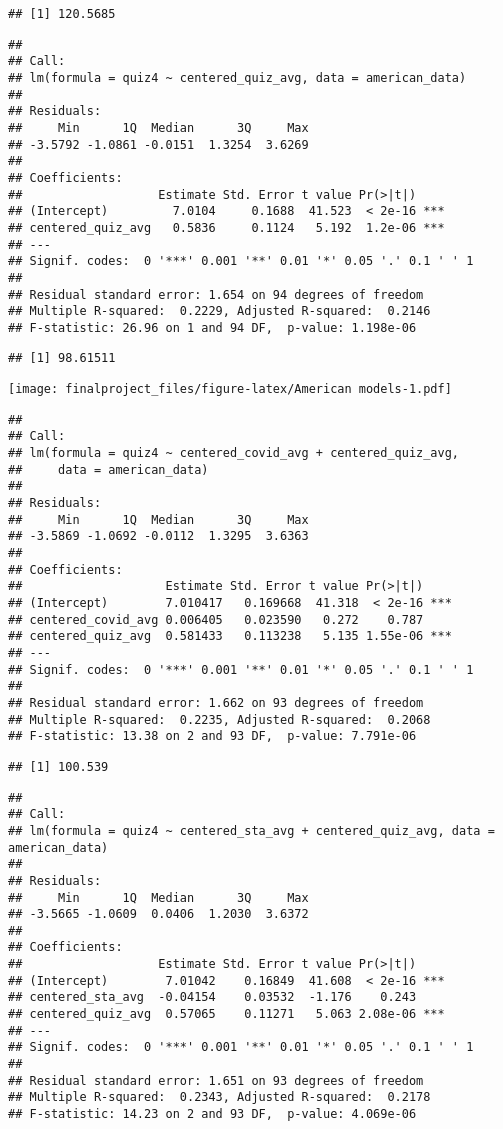 \documentclass[
]{article}
\begin{document}
\begin{verbatim}
## [1] 120.5685
\end{verbatim}

\begin{verbatim}
## 
## Call:
## lm(formula = quiz4 ~ centered_quiz_avg, data = american_data)
## 
## Residuals:
##     Min      1Q  Median      3Q     Max 
## -3.5792 -1.0861 -0.0151  1.3254  3.6269 
## 
## Coefficients:
##                   Estimate Std. Error t value Pr(>|t|)    
## (Intercept)         7.0104     0.1688  41.523  < 2e-16 ***
## centered_quiz_avg   0.5836     0.1124   5.192  1.2e-06 ***
## ---
## Signif. codes:  0 '***' 0.001 '**' 0.01 '*' 0.05 '.' 0.1 ' ' 1
## 
## Residual standard error: 1.654 on 94 degrees of freedom
## Multiple R-squared:  0.2229, Adjusted R-squared:  0.2146 
## F-statistic: 26.96 on 1 and 94 DF,  p-value: 1.198e-06
\end{verbatim}

\begin{verbatim}
## [1] 98.61511
\end{verbatim}

\texttt{[image: finalproject\_files/figure-latex/American models-1.pdf]}

\begin{verbatim}
## 
## Call:
## lm(formula = quiz4 ~ centered_covid_avg + centered_quiz_avg, 
##     data = american_data)
## 
## Residuals:
##     Min      1Q  Median      3Q     Max 
## -3.5869 -1.0692 -0.0112  1.3295  3.6363 
## 
## Coefficients:
##                    Estimate Std. Error t value Pr(>|t|)    
## (Intercept)        7.010417   0.169668  41.318  < 2e-16 ***
## centered_covid_avg 0.006405   0.023590   0.272    0.787    
## centered_quiz_avg  0.581433   0.113238   5.135 1.55e-06 ***
## ---
## Signif. codes:  0 '***' 0.001 '**' 0.01 '*' 0.05 '.' 0.1 ' ' 1
## 
## Residual standard error: 1.662 on 93 degrees of freedom
## Multiple R-squared:  0.2235, Adjusted R-squared:  0.2068 
## F-statistic: 13.38 on 2 and 93 DF,  p-value: 7.791e-06
\end{verbatim}

\begin{verbatim}
## [1] 100.539
\end{verbatim}

\begin{verbatim}
## 
## Call:
## lm(formula = quiz4 ~ centered_sta_avg + centered_quiz_avg, data = american_data)
## 
## Residuals:
##     Min      1Q  Median      3Q     Max 
## -3.5665 -1.0609  0.0406  1.2030  3.6372 
## 
## Coefficients:
##                   Estimate Std. Error t value Pr(>|t|)    
## (Intercept)        7.01042    0.16849  41.608  < 2e-16 ***
## centered_sta_avg  -0.04154    0.03532  -1.176    0.243    
## centered_quiz_avg  0.57065    0.11271   5.063 2.08e-06 ***
## ---
## Signif. codes:  0 '***' 0.001 '**' 0.01 '*' 0.05 '.' 0.1 ' ' 1
## 
## Residual standard error: 1.651 on 93 degrees of freedom
## Multiple R-squared:  0.2343, Adjusted R-squared:  0.2178 
## F-statistic: 14.23 on 2 and 93 DF,  p-value: 4.069e-06
\end{verbatim}
\end{document}
